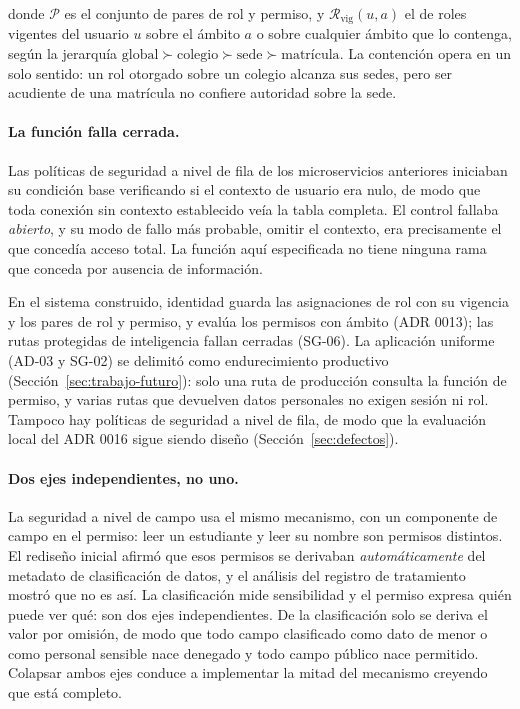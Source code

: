 \noindent donde $\mathcal{P}$ es el conjunto de pares de rol y permiso, y
$\mathcal{R}_{\text{vig}}(u, a)$ el de roles vigentes del usuario $u$ sobre el ámbito $a$ o
sobre cualquier ámbito que lo contenga, según la jerarquía
$\text{global} \succ \text{colegio} \succ \text{sede} \succ \text{matrícula}$. La contención
opera en un solo sentido: un rol otorgado sobre un colegio alcanza sus sedes, pero ser
acudiente de una matrícula no confiere autoridad sobre la sede.

\paragraph{La función falla cerrada.}

Las políticas de seguridad a nivel de fila de los microservicios anteriores iniciaban su
condición base verificando si el contexto de usuario era nulo, de modo que toda conexión sin
contexto establecido veía la tabla completa. El control fallaba \emph{abierto}, y su modo de
fallo más probable, omitir el contexto, era precisamente el que concedía acceso total. La
función aquí especificada no tiene ninguna rama que conceda por ausencia de información.

En el sistema construido, identidad guarda las asignaciones de rol con su vigencia y los
pares de rol y permiso, y evalúa los permisos con ámbito (ADR 0013); las rutas protegidas
de inteligencia fallan cerradas (SG-06). La aplicación uniforme (AD-03 y SG-02) se delimitó como
endurecimiento productivo (Sección~\ref{sec:trabajo-futuro}): solo una ruta de producción consulta la función de permiso, y varias rutas que
devuelven datos personales no exigen sesión ni rol. Tampoco hay políticas de seguridad a
nivel de fila, de modo que la evaluación local del ADR 0016 sigue siendo diseño
(Sección~\ref{sec:defectos}).

\paragraph{Dos ejes independientes, no uno.}

La seguridad a nivel de campo usa el mismo mecanismo, con un componente de campo en el
permiso: leer un estudiante y leer su nombre son permisos distintos. El rediseño inicial
afirmó que esos permisos se derivaban \emph{automáticamente} del metadato de clasificación de
datos, y el análisis del registro de tratamiento mostró que no es así. La clasificación mide
sensibilidad y el permiso expresa quién puede ver qué: son dos ejes independientes. De la
clasificación solo se deriva el valor por omisión, de modo que todo campo clasificado como
dato de menor o como personal sensible nace denegado y todo campo público nace permitido.
Colapsar ambos ejes conduce a implementar la mitad del mecanismo creyendo que está completo.

